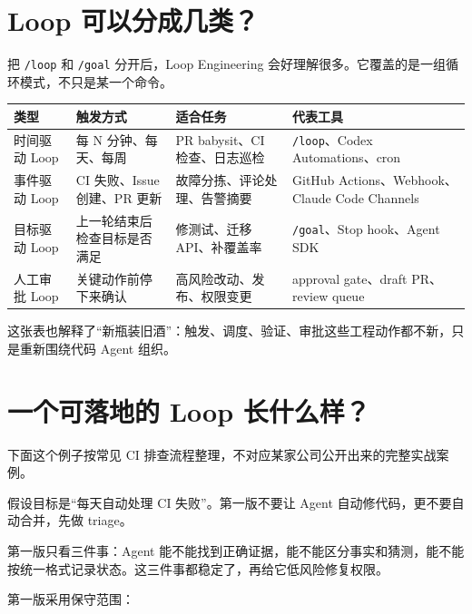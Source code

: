 \documentclass[9pt,a4paper,twocolumn]{ctexart}
\begin{document}
\section*{Loop 可以分成几类？}


把 \texttt{/loop} 和 \texttt{/goal} 分开后，Loop Engineering 会好理解很多。它覆盖的是一组循环模式，不只是某一个命令。


{\footnotesize
\begin{tabular}{|p{}|p{}|p{}|p{}|}
\hline
\textbf{类型} & \textbf{触发方式} & \textbf{适合任务} & \textbf{代表工具} \\
\hline
时间驱动 Loop & 每 N 分钟、每天、每周 & PR babysit、CI 检查、日志巡检 & \texttt{/loop}、Codex Automations、cron \\
\hline
事件驱动 Loop & CI 失败、Issue 创建、PR 更新 & 故障分拣、评论处理、告警摘要 & GitHub Actions、Webhook、Claude Code Channels \\
\hline
目标驱动 Loop & 上一轮结束后检查目标是否满足 & 修测试、迁移 API、补覆盖率 & \texttt{/goal}、Stop hook、Agent SDK \\
\hline
人工审批 Loop & 关键动作前停下来确认 & 高风险改动、发布、权限变更 & approval gate、draft PR、review queue \\
\hline
\end{tabular}
}



这张表也解释了“新瓶装旧酒”：触发、调度、验证、审批这些工程动作都不新，只是重新围绕代码 Agent 组织。



\section*{一个可落地的 Loop 长什么样？}


下面这个例子按常见 CI 排查流程整理，不对应某家公司公开出来的完整实战案例。



假设目标是“每天自动处理 CI 失败”。第一版不要让 Agent 自动修代码，更不要自动合并，先做 triage。



第一版只看三件事：Agent 能不能找到正确证据，能不能区分事实和猜测，能不能按统一格式记录状态。这三件事都稳定了，再给它低风险修复权限。



第一版采用保守范围：
\end{document}
